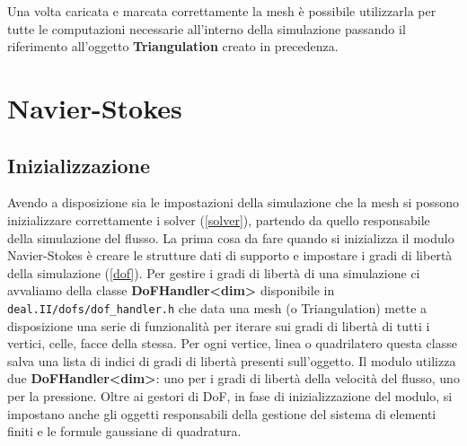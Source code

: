     Una volta caricata e marcata correttamente la mesh è possibile utilizzarla per tutte le computazioni necessarie all'interno della simulazione passando
    il riferimento all'oggetto \textbf{Triangulation} creato in precedenza.

    \section{Navier-Stokes}\label{5:navierstokes}
        \subsection{Inizializzazione}
        Avendo a disposizione sia le impostazioni della simulazione che la mesh si possono inizializzare correttamente i solver (\ref*{solver}), partendo da quello responsabile
        della simulazione del flusso.
        La prima cosa da fare quando si inizializza il modulo Navier-Stokes è creare le strutture dati di supporto e impostare i gradi di libertà della simulazione (\ref*{dof}).
        Per gestire i gradi di libertà di una simulazione ci avvaliamo della classe \textbf{DoFHandler<dim>} disponibile in \texttt{deal.II/dofs/dof\_handler.h}
        che data una mesh (o Triangulation) mette a disposizione una serie di funzionalità per iterare sui gradi di libertà di tutti i vertici, celle, facce della stessa.
        Per ogni vertice, linea o quadrilatero questa classe salva una lista di indici di gradi di libertà presenti sull'oggetto.
        Il modulo utilizza due \textbf{DoFHandler<dim>}: uno per i gradi di libertà della velocità del flusso, uno per la pressione. Oltre ai gestori di DoF, in fase di inizializzazione del modulo,
        si impostano anche gli oggetti responsabili della gestione del sistema di elementi finiti e le formule gaussiane di quadratura.
